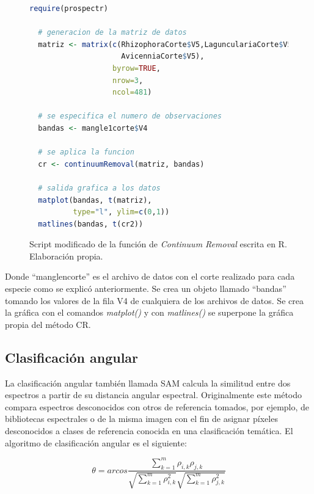 \begin{figure}[ht]
	\centering
	\begin{lstlisting}[language = R]
  require(prospectr)
  
  # generacion de la matriz de datos
  matriz <- matrix(c(RhizophoraCorte$V5,LagunculariaCorte$V5,
                     AvicenniaCorte$V5),
                   byrow=TRUE,
                   nrow=3,
                   ncol=481)
  
  # se especifica el numero de observaciones                 
  bandas <- mangle1corte$V4
  
  # se aplica la funcion
  cr <- continuumRemoval(matriz, bandas)
  
  # salida grafica a los datos
  matplot(bandas, t(matriz),
          type="l", ylim=c(0,1))
  matlines(bandas, t(cr2))
	\end{lstlisting}
	\caption[Función modificada de \textit{Continuum Removal}]{Script modificado de la función de \textit{Continuum Removal} escrita en R. Elaboración propia.}
	\label{fig:CRmodificado}
\end{figure}	

Donde ``manglencorte'' es el archivo de datos con el corte realizado para cada especie como se explicó anteriormente. Se crea un objeto llamado ``bandas'' tomando los valores de la fila V4 de cualquiera de los archivos de datos. Se crea la gráfica con el comandos \textit{matplot()} y con \textit{matlines()} se superpone la gráfica propia del método \ac{CR}.%

\subsection{Clasificación angular}
La clasificación angular también llamada \ac{SAM} calcula la similitud entre dos espectros a partir de su distancia angular espectral. Originalmente este método compara espectros desconocidos con otros de referencia tomados, por ejemplo, de bibliotecas espectrales o de la misma imagen \citep{girouard2004validated} con el fin de asignar píxeles desconocidos a clases de referencia conocida en una clasificación temática. El algoritmo de clasificación angular es el siguiente:

\begin{equation} \label{eq:angular}
	\theta = arcos \frac{\sum_{k=1}^{m} \rho_{i,k} \rho_{j,k}}{\sqrt{\sum_{k=1}^{m} \rho_{i,k}^{2}} \sqrt{\sum_{k=1}^{m} \rho_{j,k}^{2}}}
\end{equation}%

